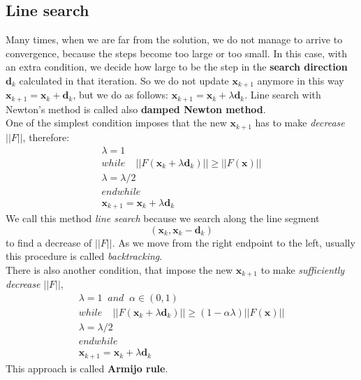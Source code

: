    \subsection{Line search} \label{line_search} Many times, when we are far from the solution, we do not manage to arrive to convergence, because the steps become too large or too small. In this case, with an extra condition, we decide how large to be the step in the \textbf{search direction} $\textbf{d}_k$ calculated in that iteration. So we do not update $\textbf{x}_{k+1}$ anymore in this way $\textbf{x}_{k+1} = \textbf{x}_{k} + \textbf{d}_k$, but we do as follows: $\textbf{x}_{k+1} = \textbf{x}_{k} + \lambda \textbf{d}_k$. Line search with Newton’s method is called also \textbf{damped Newton method}. \\
   One of the simplest condition imposes that the new $\textbf{x}_{k+1}$ has to make \textit{decrease} $||F||$, therefore:
   \begin{gather*}
   	\lambda = 1\\
   while \;\;\;\; ||F(\textbf{x}_{k} + \lambda \textbf{d}_k)|| \geq ||F(\textbf{x})||\\
   \lambda = \lambda /2 \\
   endwhile\\
   \textbf{x}_{k+1}=\textbf{x}_k + \lambda \textbf{d}_k
   \end{gather*}
     We call this method \textit{line search} because we search along the line segment
     \begin{equation*}
     (\textbf{x}_k, \textbf{x}_k - \textbf{d}_k)
     \end{equation*}
     to find a decrease of $||F||$. As we move from the right endpoint to the left, usually this procedure is called \textit{backtracking}.\\
    There is also another condition, that impose the new $\textbf{x}_{k+1}$ to make \textit{sufficiently decrease} $||F||$,
    \begin{gather*}
    	\lambda = 1 \; \; and \; \; \alpha \in (0,1)\\
    	while \; \;\;\;||F( \textbf{x}_{k} + \lambda \textbf{d}_k)|| \geq (1-\alpha\lambda)||F(\textbf{x})||\\
    	\lambda = \lambda /2 \\
    	endwhile\\
    	\textbf{x}_{k+1}=\textbf{x}_k + \lambda \textbf{d}_k
    \end{gather*}
   This approach is called \textbf{Armijo rule}. \\
